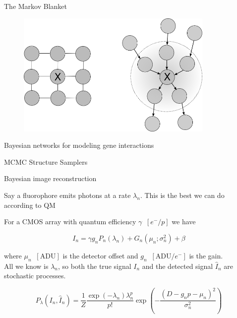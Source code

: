 \documentclass{beamer}					%
\begin{document}
\begin{frame}{The Markov Blanket}
\begin{center}
\begin{figure}
\includegraphics[width=0.85\textwidth]{blanket}
\end{figure}
\end{center}
\end{frame}

\begin{frame}{Bayesian networks for modeling gene interactions}

\end{frame}

\begin{frame}{MCMC Structure Samplers}

\end{frame}

\begin{frame}{Bayesian image reconstruction}

Say a fluorophore emits photons at a rate $\lambda_{n}$. This is the best we can do according to QM
\vspace{0.1in}

For a CMOS array with quantum efficiency $\gamma\;\;[e^{-}/p]$ we have

\begin{equation*}
I_{n} = \gamma g_{n}P_{n}(\lambda_{n}) + G_{n}(\mu_{n};\sigma_{n}^{2}) + \beta
\end{equation*}

where $\mu_{n} \;\;[\mathrm{ADU}]$ is the detector offset and $g_{n}\;\; [\mathrm{ADU}/e^{-}]$ is the gain. \\
\vspace{0.2in}
All we know is $\lambda_{n}$, so both the true signal $I_{n}$ and the detected signal $\hat{I}_{n}$ are stochastic processes. 

\begin{equation*}
P_{\lambda}(I_{n},\hat{I}_{n}) = \frac{1}{Z}\frac{\exp\left({-\lambda_{n}}\right)\lambda_{n}^{p}}{p!}\exp\left(-\frac{(D-g_{n}p-\mu_{n})^{2}}{\sigma_{n}^{2}}\right)
\end{equation*}

\end{frame}
\end{document}
